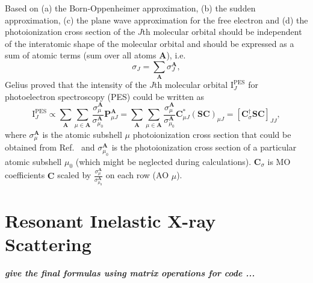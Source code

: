 \documentclass[a4paper,11pt,twoside,openright]{book}
\newcommand{\fixme}[1]{\textbf{\textit{\color{red} #1}}}
\begin{document}
Based on (a) the Born-Oppenheimer approximation, (b) the sudden approximation,
(c) the plane wave approximation for the free electron and (d) the photoionization cross
section of the $J$th molecular orbital should be independent of the interatomic shape of
the molecular orbital and should be expressed as a sum of atomic terms (sum over all
atoms $\boldsymbol{A}$), i.e.
\begin{equation}
  \sigma_{J}=\sum_{\boldsymbol{A}}\sigma_{J}^{\boldsymbol{A}},
\end{equation}
Gelius\cite{Gelius-1972,Gelius-JESRP5-985} proved that the intensity of the $J$th molecular orbital
$\text{I}_{J}^{\text{PES}}$ for photoelectron spectroscopy (PES) could be written as
\begin{equation}
  \text{I}_{J}^{\text{PES}}
  \propto\sum_{\boldsymbol{A}}\sum_{\mu\in\boldsymbol{A}}%
    \frac{\sigma_{\mu}^{\boldsymbol{A}}}{\sigma_{\mu_{0}}^{\boldsymbol{A}}}%
    \mathbf{P}_{\mu J}^{\boldsymbol{A}}%
  =\sum_{\boldsymbol{A}}\sum_{\mu\in\boldsymbol{A}}%
    \frac{\sigma_{\mu}^{\boldsymbol{A}}}{\sigma_{\mu_{0}}^{\boldsymbol{A}}}%
    \mathbf{C}^{*}_{\mu J}(\mathbf{SC})_{\mu J}
  =\left[\mathbf{C}_{\sigma}^{\dagger}\mathbf{SC}\right]_{JJ},
\end{equation}
where $\sigma_{\mu}^{\boldsymbol{A}}$ is the atomic subshell $\mu$ photoionization cross section that
could be obtained from Ref.~\cite{Yeh-ADNDT32-1} and $\sigma_{\mu_{0}}^{\boldsymbol{A}}$ is the photoionization
cross section of a particular atomic subshell $\mu_{0}$ (which might be neglected during calculations).
$\mathbf{C}_{\sigma}$ is MO coefficients $\mathbf{C}$ scaled by
$\frac{\sigma_{\mu}^{\boldsymbol{A}}}{\sigma_{\mu_{0}}^{\boldsymbol{A}}}$ on each row (AO $\mu$).

\section{Resonant Inelastic X-ray Scattering}
\label{section-RIXS}

\fixme{give the final formulas using matrix operations for code ...}
\end{document}

